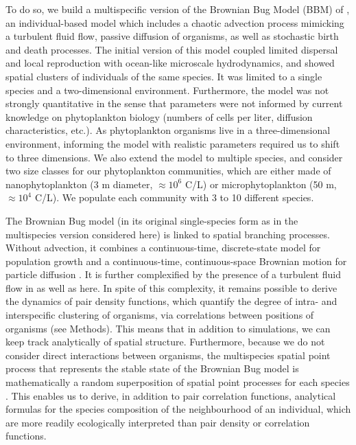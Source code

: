 \documentclass[english]{article}
\begin{document}
To do so, we build a multispecific version of the Brownian Bug Model
(BBM) of \citet{young_reproductive_2001}, an individual-based model
which includes a chaotic advection process mimicking a turbulent fluid
flow, passive diffusion of organisms, as well as stochastic birth
and death processes. The initial version of this model \citep{young_reproductive_2001}
coupled limited dispersal and local reproduction with ocean-like microscale
hydrodynamics, and showed spatial clusters of individuals of the same
species. It was limited to a single species and a two-dimensional
environment. Furthermore, the model was not strongly quantitative
\citep{picoche_rescience_2022} in the sense that parameters were
not informed by current knowledge on phytoplankton biology (numbers
of cells per liter, diffusion characteristics, etc.). As phytoplankton
organisms live in a three-dimensional environment, informing the model
with realistic parameters required us to shift to three dimensions.
We also extend the model to multiple species, and consider two size
classes for our phytoplankton communities, which are either made of
nanophytoplankton (3 \textmu m diameter, $\approx10^{6}$ C/L) or
microphytoplankton (50 \textmu m, $\approx10^{4}$ C/L). We populate
each community with 3 to 10 different species.

The Brownian Bug model (in its original single-species form as in
the multispecies version considered here) is linked to spatial branching
processes. Without advection, it combines a continuous-time, discrete-state
model for population growth and a continuous-time, continuous-space
Brownian motion for particle diffusion \citep{birch_master_2006}.
It is further complexified by the presence of a turbulent fluid flow
in \citet{young_reproductive_2001,picoche_rescience_2022} as well
as here. In spite of this complexity, it remains possible to derive
the dynamics of pair density functions, which quantify the degree
of intra- and interspecific clustering of organisms, via correlations
between positions of organisms (see Methods). This means that in addition
to simulations, we can keep track analytically of spatial structure.
Furthermore, because we do not consider direct interactions between
organisms, the multispecies spatial point process that represents
the stable state of the Brownian Bug model is mathematically a random
superposition of spatial point processes for each species \citep{illian2008statistical}.
This enables us to derive, in addition to pair correlation functions,
analytical formulas for the species composition of the neighbourhood
of an individual, which are more readily ecologically interpreted
than pair density or correlation functions. 
\end{document}
